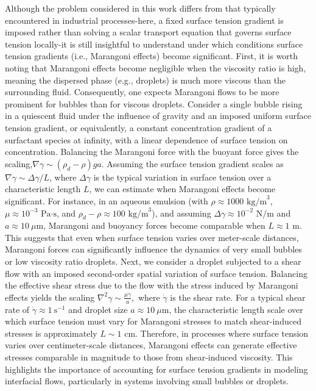 Although the problem considered in this work differs from that typically encountered in industrial processes-here, a fixed surface tension gradient is imposed rather than solving a scalar transport equation that governs surface tension locally-it is still insightful to understand under which conditions surface tension gradients (i.e., Marangoni effects) become significant.
First, it is worth noting that Marangoni effects become negligible when the viscosity ratio is high, meaning the dispersed phase (e.g., droplets) is much more viscous than the surrounding fluid. Consequently, one expects Marangoni flows to be more prominent for bubbles than for viscous droplets. 
Consider a single bubble rising in a quiescent fluid under the influence of gravity and an imposed uniform surface tension gradient, or equivalently, a constant concentration gradient of a surfactant species at infinity, with a linear dependence of surface tension on concentration. 
Balancing the Marangoni force with the buoyant force gives the scaling,$\nabla \gamma \sim (\rho_d - \rho) g a$.
Assuming the surface tension gradient scales as $\nabla \gamma \sim \Delta \gamma / L$, where $\Delta \gamma $ is the typical variation in surface tension over a characteristic length $L$, we can estimate when Marangoni effects become significant.
For instance, in an aqueous emulsion (with $\rho \approx 1000 \text{ kg/m}^3$, $\mu \approx 10^{-3} \text{ Pa·s}$, and $\rho_d - \rho \approx 100 \text{ kg/m}^3$), and assuming $\Delta \gamma \approx 10^{-2} \text{ N/m}$ and $a \approx 10\ \mu\text{m}$, Marangoni and buoyancy forces become comparable when $L \approx 1 \text{ m}$. 
This suggests that even when surface tension varies over meter-scale distances, Marangoni forces can significantly influence the dynamics of very small bubbles or low viscosity ratio droplets.
Next, we consider a droplet subjected to a shear flow with an imposed second-order spatial variation of surface tension. 
Balancing the effective shear stress due to the flow with the stress induced by Marangoni effects yields the scaling $\nabla^2 \gamma \sim \frac{\mu \dot{\gamma}}{a},$
where $\dot{\gamma}$ is the shear rate. 
For a typical shear rate of $\dot{\gamma} \approx 1\ \text{s}^{-1}$ and droplet size $a \approx 10\ \mu\text{m}$, the characteristic length scale over which surface tension must vary for Marangoni stresses to match shear-induced stresses is approximately $L \sim 1 \text{ cm}$.
Therefore, in processes where surface tension varies over centimeter-scale distances, Marangoni effects can generate effective stresses comparable in magnitude to those from shear-induced viscosity. 
This highlights the importance of accounting for surface tension gradients in modeling interfacial flows, particularly in systems involving small bubbles or droplets. %





